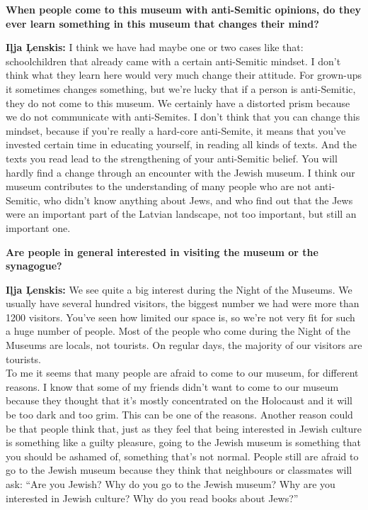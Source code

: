 \textbf{When people come to this museum with anti-Semitic opinions, do they ever learn something in this museum that changes their mind?} 

\textbf{Iļja Ļenskis:} I think we have had maybe one or two cases like that: schoolchildren that already came with a certain anti-Semitic mindset. I don’t think what they learn here would very much change their attitude. For grown-ups it sometimes changes something, but we’re lucky that if a person is anti-Semitic, they do not come to this museum. We certainly have a distorted prism because we do not communicate with anti-Semites. 
I don’t think that you can change this mindset, because if you’re really a hard-core anti-Semite, it means that you’ve invested certain time in educating yourself, in reading all kinds of texts. And the texts you read lead to the strengthening of your anti-Semitic belief. You will hardly find a change through an encounter with the Jewish museum. I think our museum contributes to the understanding of many people who are not anti-Semitic, who didn't know anything about Jews, and who find out that the Jews were an important part of the Latvian landscape, not too important, but still an important one. 

\textbf{Are people in general interested in visiting the museum or the synagogue?} 

\textbf{Iļja Ļenskis:} We see quite a big interest during the Night of the Museums. We usually have several hundred visitors, the biggest number we had were more than 1200 visitors. You've seen how limited our space is, so we’re not very fit for such a huge number of people. Most of the people who come during the Night of the Museums are locals, not tourists. On regular days, the majority of our visitors are tourists.\\
To me it seems that many people are afraid to come to our museum, for different reasons. I know that some of my friends didn't want to come to our museum because they thought that it’s mostly concentrated on the Holocaust and it will be too dark and too grim. This can be one of the reasons. Another reason could be that people think that, just as they feel that being interested in Jewish culture is something like a guilty pleasure, going to the Jewish museum is something that you should be ashamed of, something that's not normal. People still are afraid to go to the Jewish museum because they think that neighbours or classmates will ask: ``Are you Jewish? Why do you go to the Jewish museum? Why are you interested in Jewish culture? Why do you read books about Jews?'' 

